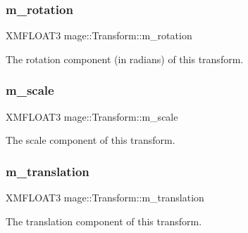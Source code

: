\subsubsection{\texorpdfstring{m\+\_\+rotation}{m\_rotation}}
{\footnotesize\ttfamily X\+M\+F\+L\+O\+A\+T3 mage\+::\+Transform\+::m\+\_\+rotation\hspace{0.3cm}{\ttfamily [private]}}

The rotation component (in radians) of this transform. \hypertarget{structmage_1_1_transform_a25d15c85b93037bab5b755c86bef0b54}{}\label{structmage_1_1_transform_a25d15c85b93037bab5b755c86bef0b54} 
\subsubsection{\texorpdfstring{m\+\_\+scale}{m\_scale}}
{\footnotesize\ttfamily X\+M\+F\+L\+O\+A\+T3 mage\+::\+Transform\+::m\+\_\+scale\hspace{0.3cm}{\ttfamily [private]}}

The scale component of this transform. \hypertarget{structmage_1_1_transform_a57e27b28e0cf85be034055a68513ad79}{}\label{structmage_1_1_transform_a57e27b28e0cf85be034055a68513ad79} 
\subsubsection{\texorpdfstring{m\+\_\+translation}{m\_translation}}
{\footnotesize\ttfamily X\+M\+F\+L\+O\+A\+T3 mage\+::\+Transform\+::m\+\_\+translation\hspace{0.3cm}{\ttfamily [private]}}

The translation component of this transform. 